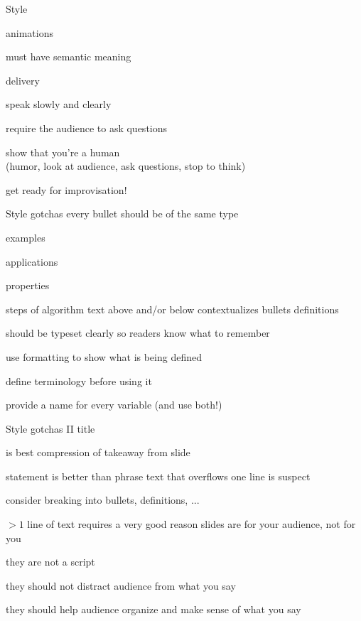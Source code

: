 \documentclass[presentation,xcolor={usenames,dvipsnames}]{beamer}
\begin{document}
\begin{frame}{Style}

animations
\bit
\item must have semantic meaning
\eit

delivery
\bit
\item speak slowly and clearly
\item require the audience to ask questions
\item show that you're a human \\
(humor, look at audience, ask questions, stop to think)
\item get ready for improvisation!
\eit

\end{frame}

\begin{frame}{Style gotchas}
every bullet should be of the same type
\bit
\item examples
\item applications
\item properties
\item steps of algorithm
\eit
text above and/or below contextualizes bullets
\pause \vfill
definitions
\bit
\item should be typeset clearly so readers know what to remember
\item use formatting to show what is being defined
\item define terminology before using it
\item provide a name for every variable (and use both!)
\eit
\end{frame}

\begin{frame}{Style gotchas II}
title
\bit
\item is best compression of takeaway from slide
\item statement is better than phrase
\eit
\pause \vfill
text that overflows one line is suspect
\bit
\item consider breaking into bullets, definitions, ...
\item $>1$ line of text requires a very good reason
\eit
\pause \vfill
slides are for your audience, not for you
\bit
\item they are not a script
\item they should not distract audience from what you say
\item they should help audience organize and make sense of what you say
\eit
\end{frame}
\end{document}
